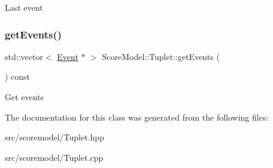 Last event \mbox{\label{classScoreModel_1_1Tuplet_a6091b290c47f35d5d9fcc47bfb6f1a5c}} 
\subsubsection{\texorpdfstring{getEvents()}{getEvents()}}
{\footnotesize\ttfamily std\+::vector$<$ \mbox{\hyperlink{classScoreModel_1_1Event}{Event}} $\ast$ $>$ Score\+Model\+::\+Tuplet\+::get\+Events (\begin{DoxyParamCaption}{ }\end{DoxyParamCaption}) const}

Get events 

The documentation for this class was generated from the following files\+:\begin{DoxyCompactItemize}
\item 
src/scoremodel/Tuplet.\+hpp\item 
src/scoremodel/Tuplet.\+cpp\end{DoxyCompactItemize}
